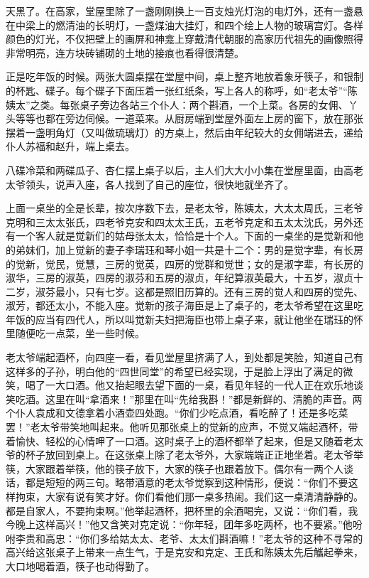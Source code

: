 \par 天黑了。在高家，堂屋里除了一盏刚刚换上一百支烛光灯泡的电灯外，还有一盏悬在中梁上的燃清油的长明灯，一盏煤油大挂灯，和四个绘上人物的玻璃宫灯。各样颜色的灯光，不仅把壁上的画屏和神龛上穿戴清代朝服的高家历代祖先的画像照得非常明亮，连方块砖铺砌的土地的接痕也看得很清楚。
\par 正是吃年饭的时候。两张大圆桌摆在堂屋中间，桌上整齐地放着象牙筷子，和银制的杯匙、碟子。每个碟子下面压着一张红纸条，写上各人的称呼，如“老太爷”“陈姨太”之类。每张桌子旁边各站三个仆人：两个斟酒，一个上菜。各房的女佣、丫头等等也都在旁边伺候。一道菜来。从厨房端到堂屋外面左上房的窗下，放在那张摆着一盏明角灯（又叫做琉璃灯）的方桌上，然后由年纪较大的女佣端进去，递给仆人苏福和赵升，端上桌去。
\par 八碟冷菜和两碟瓜子、杏仁摆上桌子以后，主人们大大小小集在堂屋里面，由高老太爷领头，说声入座，各人找到了自己的座位，很快地就坐齐了。
\par 上面一桌坐的全是长辈，按次序数下去，是老太爷，陈姨太，大太太周氏，三老爷克明和三太太张氏，四老爷克安和四太太王氏，五老爷克定和五太太沈氏，另外还有一个客人就是觉新们的姑母张太太，恰恰是十个人。下面的一桌坐的是觉新和他的弟妹们，加上觉新的妻子李瑞珏和琴小姐一共是十二个：男的是觉字辈，有长房的觉新，觉民，觉慧，三房的觉英，四房的觉群和觉世；女的是淑字辈，有长房的淑华，三房的淑英，四房的淑芬和五房的淑贞，年纪算淑英最大，十五岁，淑贞十二岁，淑芬最小，只有七岁。这都是照旧历算的。还有三房的觉人和四房的觉先、淑芳，都还太小，不能入座。觉新的孩子海臣是上了桌子的，老太爷希望在这里吃年饭的应当有四代人，所以叫觉新夫妇把海臣也带上桌子来，就让他坐在瑞珏的怀里随便吃一点菜，坐一些时候。
\par 老太爷端起酒杯，向四座一看，看见堂屋里挤满了人，到处都是笑脸，知道自己有这样多的子孙，明白他的“四世同堂”的希望已经实现，于是脸上浮出了满足的微笑，喝了一大口酒。他又抬起眼去望下面的一桌，看见年轻的一代人正在欢乐地谈笑吃酒。这里在叫“拿酒来！”那里在叫“先给我斟！”都是新鲜的、清脆的声音。两个仆人袁成和文德拿着小酒壶四处跑。“你们少吃点酒，看吃醉了！还是多吃菜罢！”老太爷带笑地叫起来。他听见那张桌上的觉新的应声，不觉又端起酒杯，带着愉快、轻松的心情呷了一口酒。这时桌子上的酒杯都举了起来，但是又随着老太爷的杯子放回到桌上。在这张桌上除了老太爷外，大家端端正正地坐着。老太爷举筷，大家跟着举筷，他的筷子放下，大家的筷子也跟着放下。偶尔有一两个人谈话，都是短短的两三句。略带酒意的老太爷觉察到这种情形，便说：“你们不要这样拘束，大家有说有笑才好。你们看他们那一桌多热闹。我们这一桌清清静静的。都是自家人，不要拘束啊。”他举起酒杯，把杯里的余酒喝完，又说：“你们看，我今晚上这样高兴！”他又含笑对克定说：“你年轻，团年多吃两杯，也不要紧。”他吩咐李贵和高忠：“你们多给姑太太、老爷、太太们斟酒嘛！”老太爷的这种不寻常的高兴给这张桌子上带来一点生气，于是克安和克定、王氏和陈姨太先后觿起拳来，大口地喝着酒，筷子也动得勤了。
